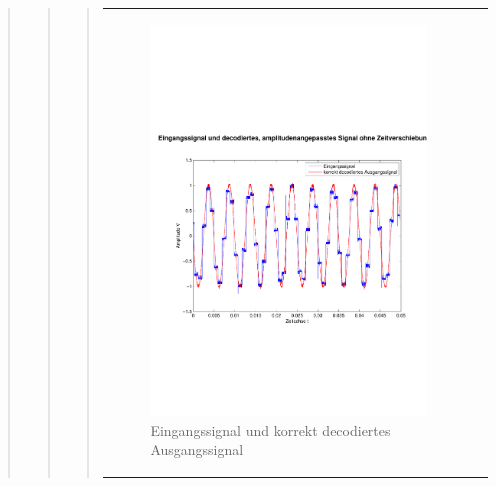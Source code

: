 \begin{quote}
\begin{quote}
\begin{quote}
\begin{center}
\begin{tabular}{ll}
                    \begin{minipage}{0.6\textwidth}
                        \begin{figure}[H]
                            \includegraphics[scale=0.4,trim = 0cm 7cm 0cm
                            7.5cm, clip]
                            {./Bilder/sin8_Eingang_vs_korrektDecodiert}
                              \caption{Eingangssignal und \newline
                              korrekt decodiertes Ausgangssignal}
                        \end{figure}
                    \end{minipage}
                
                \end{tabular}
            \end{center}
            

\end{quote}
\end{quote}
\end{quote}
